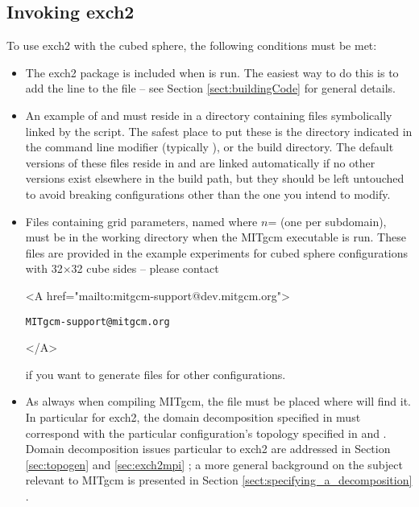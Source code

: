 \subsection{Invoking exch2}

To use exch2 with the cubed sphere, the following conditions must be
met:

\begin{itemize}
\item The exch2 package is included when  is run.  The
  easiest way to do this is to add the line  to the
   file -- see Section \ref{sect:buildingCode}
   for general details.
  
\item An example of  and
   must reside in a directory containing files
  symbolically linked by the  script.  The safest place
  to put these is the directory indicated in the 
  command line modifier (typically ), or the build
  directory.  The default versions of these files reside in
   and are linked automatically if no other versions
  exist elsewhere in the build path, but they should be left untouched
  to avoid breaking configurations other than the one you intend to
  modify.
  
\item Files containing grid parameters, named 
  where $n$= (one per subdomain), must be in the working
  directory when the MITgcm executable is run.  These files are
  provided in the example experiments for cubed sphere configurations
  with 32$\times$32 cube sides -- please contact
  \begin{rawhtml}
    <A href="mailto:mitgcm-support@dev.mitgcm.org"> 
  \end{rawhtml} 
\begin{verbatim}
MITgcm-support@mitgcm.org
\end{verbatim}
  \begin{rawhtml} </A> \end{rawhtml}
  if you want to generate files for other configurations.
  
\item As always when compiling MITgcm, the file  must be
  placed where  will find it.  In particular for exch2,
  the domain decomposition specified in  must correspond
  with the particular configuration's topology specified in
   and .  Domain
  decomposition issues particular to exch2 are addressed in Section
  \ref{sec:topogen} 
  and \ref{sec:exch2mpi} ; a more general background on the subject
  relevant to MITgcm is presented in Section
  \ref{sect:specifying_a_decomposition} .
\end{itemize}



